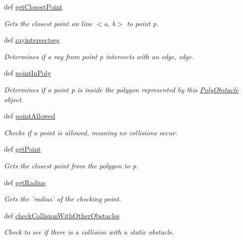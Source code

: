 \begin{DoxyCompactItemize}
def \hyperlink{classobstacle_1_1PolyObstacle_a43adce887280997dfb49067e741f54db}{get\-Closest\-Point}
\begin{DoxyCompactList}\small\item\em Gets the closest point on line $<$a, b$>$ to point p. \end{DoxyCompactList}\item 
def \hyperlink{classobstacle_1_1PolyObstacle_a646f5fc4ba3e67c98c2313f4493b6a08}{rayintersectseg}
\begin{DoxyCompactList}\small\item\em Determines if a ray from point p intersects with an edge, edge. \end{DoxyCompactList}\item 
def \hyperlink{classobstacle_1_1PolyObstacle_a4647d9efa8fb20d7b464ee5faa8fd7f4}{point\-In\-Poly}
\begin{DoxyCompactList}\small\item\em Determines if a point p is inside the polygon represented by this \hyperlink{classobstacle_1_1PolyObstacle}{Poly\-Obstacle} object. \end{DoxyCompactList}\item 
def \hyperlink{classobstacle_1_1PolyObstacle_af71f01fca50193a5e5372c2507661ada}{point\-Allowed}
\begin{DoxyCompactList}\small\item\em Checks if a point is allowed, meaning no collisions occur. \end{DoxyCompactList}\item 
def \hyperlink{classobstacle_1_1PolyObstacle_af866b6f101194b8a8731f2394fdc247e}{get\-Point}
\begin{DoxyCompactList}\small\item\em Gets the closest point from the polygon to p. \end{DoxyCompactList}\item 
def \hyperlink{classobstacle_1_1PolyObstacle_a205face22efbad01fd4c96fbe73321fd}{get\-Radius}
\begin{DoxyCompactList}\small\item\em Gets the 'radius' of the checking point. \end{DoxyCompactList}\item 
def \hyperlink{classobstacle_1_1PolyObstacle_af4f36a0612aa485298e12cd70a2677cb}{check\-Collision\-With\-Other\-Obstacles}
\begin{DoxyCompactList}\small\item\em Check to see if there is a collision with a static obstacle. \end{DoxyCompactList}\item 

\end{DoxyCompactItemize}
